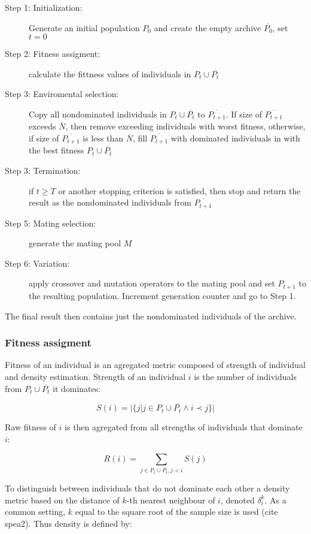 \documentclass[12pt,oneside,draft]{fithesis2}
\begin{document}
\begin{description}
	\item[Step 1: Initialization:] Generate an initial population $P_0$ and create the empty archive $\overline{P_0}$, set $t=0$
	\item[Step 2: Fitness assigment:] calculate the fittness values of individuals in $P_t \cup \overline{P_t}$
	\item[Step 3: Enviromental selection:] Copy all nondominated individuals in $P_t \cup \overline{P_t}$ to $\overline{P_{t+1}}$. If size of $\overline{P_{t+1}}$ exceeds $\overline N$, then remove exceeding individuals with worst fitness, otherwise, if size of $\overline{P_{t+1}}$ is less than $\overline N$, fill $\overline{P_{t+1}}$ with dominated individuals in  with the best fitness $P_t \cup \overline{P_t}$
	\item[Step 3: Termination:] if $t \geq T$ or another stopping criterion is satisfied, then stop and return the result as the nondominated individuals from $\overline{P_{t+1}}$
	\item[Step 5: Mating selection:] generate the mating pool $M$
	\item[Step 6: Variation:] apply crossover and mutation operators to the mating pool and set $P_{t+1}$ to the resulting population. Increment generation counter and go to Step 1.
\end{description}

The final result then contains just the nondominated individuals of the archive.

\subsubsection{Fitness assigment}
	Fitness of an individual is an agregated metric composed of strength of individual and density estimation. Strength of an individual $i$ is the number of individuals from $P_t \cup \overline{P_t}$ it dominates:

$$ S(i) = |\{j| j \in P_t \cup \overline{P_t} \land i \prec j\}| $$

Raw fitness of $i$ is then agregated from all strengths of individuals that dominate $i$:

$$ R(i) = \sum\limits_{j \in P_t \cup \overline{P_t},j \prec i} S(j)$$

To distinguish between individuals that do not dominate each other a density metric based on the distance of $k$-th nearest neighbour of $i$, denoted $\delta^k_i$. As a common setting, $k$ equal to the square root of the sample size is used (cite spea2). Thus density is defined by:
\end{document}
